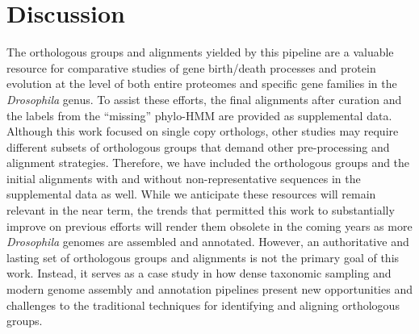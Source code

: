 \section{Discussion}
The orthologous groups and alignments yielded by this pipeline are a valuable resource for comparative studies of gene birth/death processes and protein evolution at the level of both entire proteomes and specific gene families in the \textit{Drosophila} genus. To assist these efforts, the final alignments after curation and the labels from the ``missing'' phylo-HMM are provided as supplemental data. Although this work focused on single copy orthologs, other studies may require different subsets of orthologous groups that demand other pre-processing and alignment strategies. Therefore, we have included the orthologous groups and the initial alignments with and without non-representative sequences in the supplemental data as well. While we anticipate these resources will remain relevant in the near term, the trends that permitted this work to substantially improve on previous efforts will render them obsolete in the coming years as more \textit{Drosophila} genomes are assembled and annotated. However, an authoritative and lasting set of orthologous groups and alignments is not the primary goal of this work. Instead, it serves as a case study in how dense taxonomic sampling and modern genome assembly and annotation pipelines present new opportunities and challenges to the traditional techniques for identifying and aligning orthologous groups.

